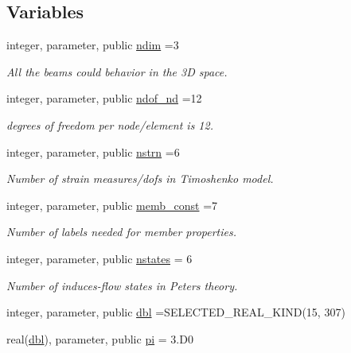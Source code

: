 \subsection*{Variables}
\begin{DoxyCompactItemize}
\item 
integer, parameter, public \hyperlink{namespaceglobaldatafun_a5041a6e08575b124a458c49a76dc6d31}{ndim} =3
\begin{DoxyCompactList}\small\item\em All the beams could behavior in the 3D space. \end{DoxyCompactList}\item 
integer, parameter, public \hyperlink{namespaceglobaldatafun_a44ab75808fb35a144d54fa9a6c9fe07a}{ndof\+\_\+nd} =12
\begin{DoxyCompactList}\small\item\em degrees of freedom per node/element is 12. \end{DoxyCompactList}\item 
integer, parameter, public \hyperlink{namespaceglobaldatafun_a3aff613607f0e62fc5c5739e9f2432e9}{nstrn} =6
\begin{DoxyCompactList}\small\item\em Number of strain measures/dofs in Timoshenko model. \end{DoxyCompactList}\item 
integer, parameter, public \hyperlink{namespaceglobaldatafun_ae88f4c5de30b425e43d5392116dfdcda}{memb\+\_\+const} =7
\begin{DoxyCompactList}\small\item\em Number of labels needed for member properties. \end{DoxyCompactList}\item 
integer, parameter, public \hyperlink{namespaceglobaldatafun_a2c33dd8d5d818282893dd132f6b33564}{nstates} = 6
\begin{DoxyCompactList}\small\item\em Number of induces-\/flow states in Peters theory. \end{DoxyCompactList}\item 
integer, parameter, public \hyperlink{namespaceglobaldatafun_a5008801201dd34f2af8eae07756befb4}{dbl} =S\+E\+L\+E\+C\+T\+E\+D\+\_\+\+R\+E\+A\+L\+\_\+\+K\+I\+ND(15, 307)
\item 
real(\hyperlink{namespaceglobaldatafun_a5008801201dd34f2af8eae07756befb4}{dbl}), parameter, public \hyperlink{namespaceglobaldatafun_a05144a47841796a672385a1db57f91a1}{pi} = 3.\+D0

\end{DoxyCompactItemize}
